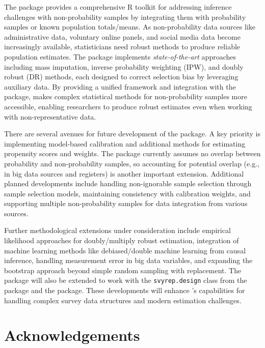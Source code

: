 \documentclass[
]{jss}
\begin{document}
The  package provides a comprehensive R toolkit for
addressing inference challenges with non-probability samples by
integrating them with probability samples or known population
totals/means. As non-probability data sources like administrative data,
voluntary online panels, and social media data become increasingly
available, statisticians need robust methods to produce reliable
population estimates. The package implements \textit{state-of-the-art}
approaches including mass imputation, inverse probability weighting
(IPW), and doubly robust (DR) methods, each designed to correct
selection bias by leveraging auxiliary data. By providing a unified
framework and integration with the  package,
 makes complex statistical methods for non-probability
samples more accessible, enabling researchers to produce robust
estimates even when working with non-representative data.

There are several avenues for future development of the 
package. A key priority is implementing model-based calibration and
additional methods for estimating propensity scores and weights. The
package currently assumes no overlap between probability and
non-probability samples, so accounting for potential overlap (e.g., in
big data sources and registers) is another important extension.
Additional planned developments include handling non-ignorable sample
selection through sample selection models, maintaining consistency with
calibration weights, and supporting multiple non-probability samples for
data integration from various sources.

Further methodological extensions under consideration include empirical
likelihood approaches for doubly/multiply robust estimation, integration
of machine learning methods like debiased/double machine learning from
causal inference, handling measurement error in big data variables, and
expanding the bootstrap approach beyond simple random sampling with
replacement. The package will also be extended to work with the
\texttt{svyrep.design} class from the  package and the
 package. These developments will enhance 's
capabilities for handling complex survey data structures and modern
estimation challenges.

\section{Acknowledgements}\label{sec-acknowledgements}
\end{document}
